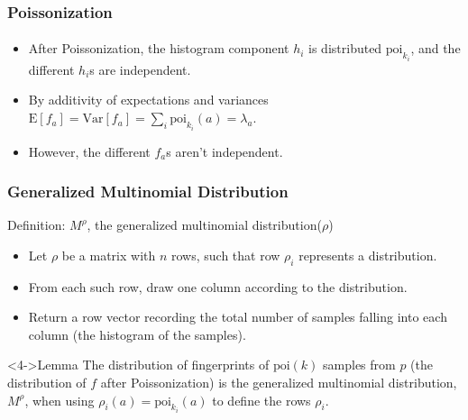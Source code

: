 \documentclass{beamer}
\newcommand{\E}{\mbox{E}} \newcommand{\Cov}{\mbox{Cov}}
\newcommand{\Var}{\mbox{Var}} \newcommand{\Varx}{\mathop{\bf Var\/}}
\begin{document}
\begin{frame}
  \frametitle{Poissonization} \framesubtitle{}

  
  \begin{itemize}
  \item<1-> After Poissonization, the histogram component $h_i$ is
    distributed $\mbox{poi}_{k_i}$, and the different $h_i$s are independent.
  \item<2-> By additivity of expectations and variances
    $\E[f_a]=\Var[f_a]=\sum_i\mbox{poi}_{k_i}(a)=\lambda_a$.
  \item<3-> However, the different $f_a$s aren't independent.
 \end{itemize}
  
\end{frame}


\begin{frame}
  \frametitle{Generalized Multinomial Distribution}
  \begin{block}{Definition: $M^\rho$, the generalized multinomial
      distribution($\rho$)}
  
    \begin{itemize}
    \item<1-> Let $\rho$ be a matrix with $n$ rows, such that row
      $\rho_i$ represents a distribution.
    \item<2-> From each such row, draw one column according to the
      distribution.
    \item<3-> Return a row vector recording the total number of
      samples falling into each column (the histogram of the samples).
    \end{itemize}
  \end{block}

  \begin{block}<4->{Lemma} The distribution of fingerprints of
    $\mbox{poi}(k)$ samples from $p$ (the distribution of $f$ after
    Poissonization) is the generalized multinomial distribution,
    $M^\rho$, when using $\rho_i(a)=\mbox{poi}_{k_i}(a)$ to define the
    rows $\rho_i$.
  \end{block}
\end{frame}
\end{document}
